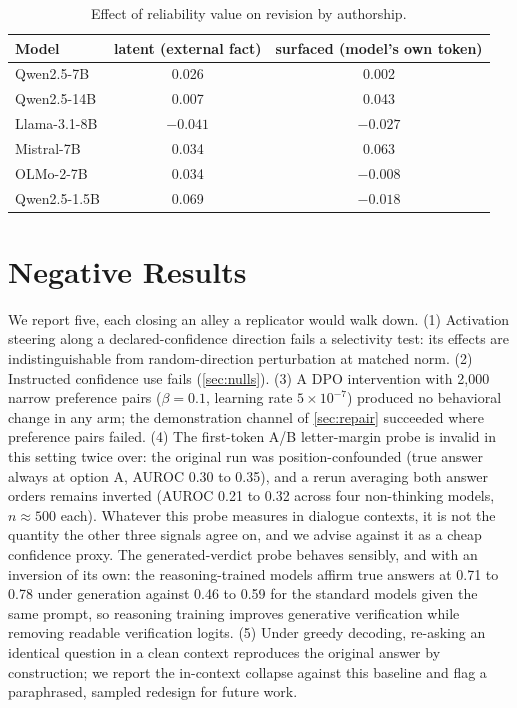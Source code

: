 \documentclass{article}
\begin{document}
\begin{table}[h]
\centering
\caption{Effect of reliability value on revision by authorship.}
\vskip 0.1in
\begin{tabular}{lcc}
\toprule
Model & latent (external fact) & surfaced (model's own token) \\
\midrule
Qwen2.5-7B & 0.026 & 0.002 \\
Qwen2.5-14B & 0.007 & 0.043 \\
Llama-3.1-8B & $-0.041$ & $-0.027$ \\
Mistral-7B & 0.034 & 0.063 \\
OLMo-2-7B & 0.034 & $-0.008$ \\
Qwen2.5-1.5B & 0.069 & $-0.018$ \\
\bottomrule
\end{tabular}
\end{table}

\section{Negative Results}
\label{app:negative}

We report five, each closing an alley a replicator would walk down. (1) Activation steering along a declared-confidence direction fails a selectivity test: its effects are indistinguishable from random-direction perturbation at matched norm. (2) Instructed confidence use fails (\cref{sec:nulls}). (3) A DPO intervention with 2{,}000 narrow preference pairs ($\beta=0.1$, learning rate $5\times10^{-7}$) produced no behavioral change in any arm; the demonstration channel of \cref{sec:repair} succeeded where preference pairs failed. (4) The first-token A/B letter-margin probe is invalid in this setting twice over: the original run was position-confounded (true answer always at option A, AUROC 0.30 to 0.35), and a rerun averaging both answer orders remains inverted (AUROC 0.21 to 0.32 across four non-thinking models, $n \approx 500$ each). Whatever this probe measures in dialogue contexts, it is not the quantity the other three signals agree on, and we advise against it as a cheap confidence proxy. The generated-verdict probe behaves sensibly, and with an inversion of its own: the reasoning-trained models affirm true answers at 0.71 to 0.78 under generation against 0.46 to 0.59 for the standard models given the same prompt, so reasoning training improves generative verification while removing readable verification logits. (5) Under greedy decoding, re-asking an identical question in a clean context reproduces the original answer by construction; we report the in-context collapse against this baseline and flag a paraphrased, sampled redesign for future work.
\end{document}
